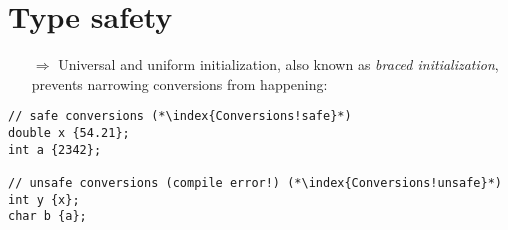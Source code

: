 \documentclass[10pt]{article}
\begin{document}
\section{Type safety}
\small
\begin{enumerate}
\item[$\Rightarrow$] Universal and uniform initialization, also known as \emph{braced initialization}, prevents narrowing conversions from happening:
\end{enumerate}
\begin{lstlisting}
// safe conversions (*\index{Conversions!safe}*)
double x {54.21};
int a {2342};

// unsafe conversions (compile error!) (*\index{Conversions!unsafe}*)
int y {x};
char b {a};
\end{lstlisting}
%
%
\end{document}
